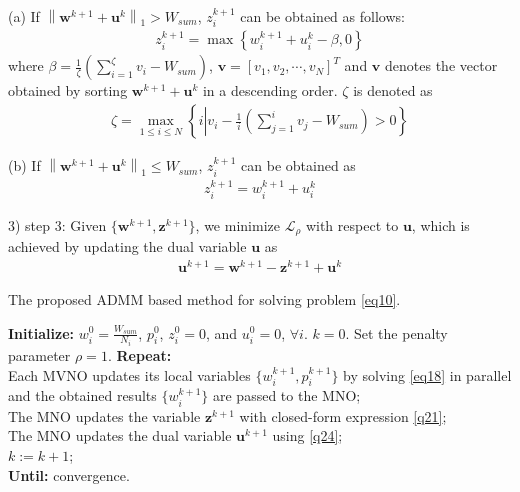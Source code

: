 \documentclass[journal]{IEEEtran}
\begin{document}
(a) If $\left\|\mathbf{w}^{k+1} + \mathbf{u}^k \right\|_1 > W_{sum}$, $z_i^{k+1}$ can be obtained as follows:
\begin{align} \label{q21}
z_i^{k+1} = \max\left\{w_i^{k+1} + u_i^k - \beta, 0\right\}
\end{align}
where $\beta = \frac{1}{\zeta}\left(\sum\limits_{i = 1}^{\zeta} v_i - W_{sum} \right)$, $\mathbf{v} = \left[v_1, v_2, \cdots, v_N\right]^T$ and $\mathbf{v}$ denotes the vector obtained by sorting $\mathbf{w}^{k+1} + \mathbf{u}^k$ in a descending order. $\zeta$ is denoted as 
\begin{align}
\zeta = \max_{1 \leq i \leq N} \left\{ i \left| v_i - \frac{1}{i}\left(\sum\limits_{j = 1}^{i} v_j - W_{sum}\right) > 0 \right. \right\}
\end{align}

(b) If $\left\|\mathbf{w}^{k+1} + \mathbf{u}^k \right\|_1 \leq W_{sum}$, $z_i^{k+1}$ can be obtained as
\begin{align}
z_i^{k+1} = w_i^{k+1} + u_i^k
\end{align}

3) step 3: Given $\{\mathbf{w}^{k+1}, \mathbf{z}^{k+1}\}$, we minimize $\mathcal{L}_\rho$ with respect to $\mathbf{u}$, which is achieved
by updating the dual variable $\mathbf{u}$ as
\begin{align} \label{q24}
\mathbf{u}^{k+1} =\mathbf{w}^{k+1} - \mathbf{z}^{k+1} + \mathbf{u}^k
\end{align}
\begin{algorithm}[h]
	\caption{The proposed ADMM based method for solving problem \eqref{eq10}.}
	\begin{algorithmic}[1]
		\STATE \textbf{Initialize:} $w_i^0 = \frac{W_{sum}}{N_i}$, $p_i^0$, $z_i^0 = 0$, and $u_i^0 = 0$, $\forall i$. $k = 0$. Set the penalty parameter $\rho = 1$. \STATE
		\textbf{Repeat:} \\
		Each MVNO updates its local variables $\{w_i^{k+1}, p_i^{k+1}\}$ by solving \eqref{eq18} in parallel and the obtained results $\{w_i^{k+1}\}$ are passed to the MNO;\\
		The MNO updates the variable $\mathbf{z}^{k+1}$ with closed-form expression \eqref{q21};\\
		The MNO updates the dual variable $\mathbf{u}^{k+1}$ using \eqref{q24};\\
		$k:=k+1$;\\
		\STATE \textbf{Until:} convergence.
	\end{algorithmic}
\end{algorithm}
\end{document}
